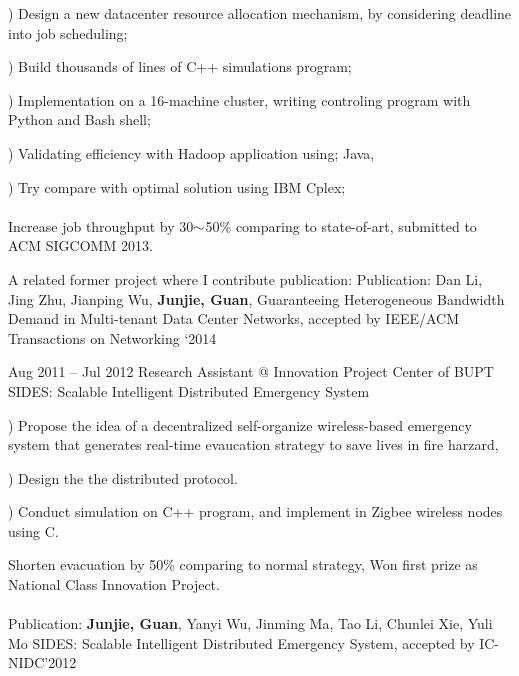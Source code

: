 \documentclass{tccv}
\begin{document}
\begin{eventlist}
     ) Design a new datacenter resource allocation mechanism, by considering deadline into job scheduling;
     
     ) Build thousands of lines of C++ simulations program;
     
     ) Implementation on a 16-machine cluster, writing controling  program with Python and Bash shell;
     
     ) Validating efficiency with Hadoop application using; Java, 
     
     ) Try compare with optimal solution using IBM Cplex;
	\\\\
     Increase job throughput by 30$\scriptsize{\sim}$50\% comparing to state-of-art, submitted to ACM SIGCOMM 2013.
     
     \quad A related former project where I contribute publication: Publication: Dan Li, Jing Zhu, Jianping Wu, \textbf{Junjie, Guan}, Guaranteeing Heterogeneous Bandwidth Demand in Multi-tenant Data Center Networks, accepted by IEEE/ACM Transactions on Networking ‘2014
     
     
     
     
     
     
     
     
     
     
    
    
    
    
    
    
    
    
    
    
    
    
    
    
    
    
    
    










\clearpage
\item{Aug 2011 -- Jul 2012}
     {Research Assistant @ Innovation Project Center of BUPT}
     {SIDES: Scalable Intelligent Distributed Emergency System}
     
     ) Propose the idea of a decentralized self-organize wireless-based emergency system that generates real-time evaucation strategy to save lives in fire harzard, 
     
     ) Design the the distributed protocol.
     
     ) Conduct simulation on C++ program, and implement in Zigbee wireless nodes using C.
     
Shorten evacuation by 50\% comparing to normal strategy, Won first prize as National Class Innovation Project.
\\\\
Publication: \textbf{Junjie, Guan}, Yanyi Wu, Jinming Ma, Tao Li, Chunlei Xie, Yuli Mo SIDES: Scalable Intelligent Distributed Emergency System, accepted by IC-NIDC’2012
     
\end{eventlist}
\end{document}

